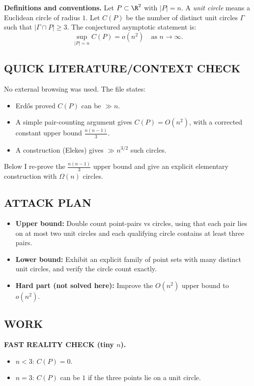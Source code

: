 \medskip
\noindent\textbf{Definitions and conventions.}
Let $P\subset\R^2$ with $|P|=n$.
A \emph{unit circle} means a Euclidean circle of radius $1$.
Let $C(P)$ be the number of distinct unit circles $\Gamma$ such that $|\Gamma\cap P|\ge 3$.
The conjectured asymptotic statement is:
\[\sup_{|P|=n} C(P) = o(n^2)\quad\text{as }n\to\infty.
\]

\subsection*{QUICK LITERATURE/CONTEXT CHECK}
No external browsing was used.
The file states:
\begin{itemize}[leftmargin=2em]
\item Erd\H{o}s proved $C(P)$ can be $\gg n$.
\item A simple pair-counting argument gives $C(P)=O(n^2)$, with a corrected constant upper bound $\frac{n(n-1)}{3}$.
\item A construction (Elekes) gives $\gg n^{3/2}$ such circles.
\end{itemize}
Below I re-prove the $\frac{n(n-1)}{3}$ upper bound and give an explicit elementary construction with $\Omega(n)$ circles.

\subsection*{ATTACK PLAN}
\begin{itemize}[leftmargin=2em]
\item \textbf{Upper bound:} Double count point-pairs vs circles, using that each pair lies on at most two unit circles and each qualifying circle contains at least three pairs.
\item \textbf{Lower bound:} Exhibit an explicit family of point sets with many distinct unit circles, and verify the circle count exactly.
\item \textbf{Hard part (not solved here):} Improve the $O(n^2)$ upper bound to $o(n^2)$.
\end{itemize}

\subsection*{WORK}
\noindent\textbf{FAST REALITY CHECK (tiny $n$).}
\begin{itemize}[leftmargin=2em]
\item $n<3$: $C(P)=0$.
\item $n=3$: $C(P)$ can be $1$ if the three points lie on a unit circle.
\end{itemize}

